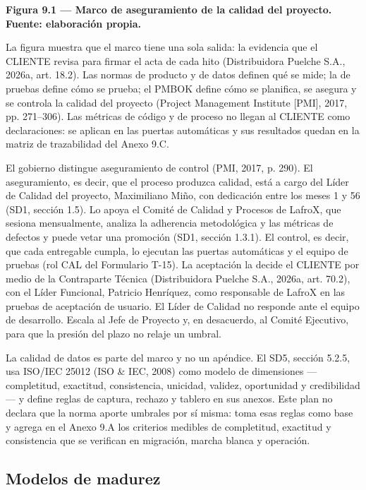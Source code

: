 \textbf{Figura 9.1 — Marco de aseguramiento de la calidad del proyecto. Fuente: elaboración propia.}

La figura muestra que el marco tiene una sola salida: la evidencia que el CLIENTE revisa para firmar el acta de cada hito (Distribuidora Puelche S.A., 2026a, art. 18.2). Las normas de producto y de datos definen qué se mide; la de pruebas define cómo se prueba; el PMBOK define cómo se planifica, se asegura y se controla la calidad del proyecto (Project Management Institute [PMI], 2017, pp. 271–306). Las métricas de código y de proceso no llegan al CLIENTE como declaraciones: se aplican en las puertas automáticas y sus resultados quedan en la matriz de trazabilidad del Anexo 9.C.

El gobierno distingue aseguramiento de control (PMI, 2017, p. 290). El aseguramiento, es decir, que el proceso produzca calidad, está a cargo del Líder de Calidad del proyecto, Maximiliano Miño, con dedicación entre los meses 1 y 56 (SD1, sección 1.5). Lo apoya el Comité de Calidad y Procesos de LafroX, que sesiona mensualmente, analiza la adherencia metodológica y las métricas de defectos y puede vetar una promoción (SD1, sección 1.3.1). El control, es decir, que cada entregable cumpla, lo ejecutan las puertas automáticas y el equipo de pruebas (rol CAL del Formulario T-15). La aceptación la decide el CLIENTE por medio de la Contraparte Técnica (Distribuidora Puelche S.A., 2026a, art. 70.2), con el Líder Funcional, Patricio Henríquez, como responsable de LafroX en las pruebas de aceptación de usuario. El Líder de Calidad no responde ante el equipo de desarrollo. Escala al Jefe de Proyecto y, en desacuerdo, al Comité Ejecutivo, para que la presión del plazo no relaje un umbral.

La calidad de datos es parte del marco y no un apéndice. El SD5, sección 5.2.5, usa ISO/IEC 25012 (ISO \& IEC, 2008) como modelo de dimensiones —completitud, exactitud, consistencia, unicidad, validez, oportunidad y credibilidad— y define reglas de captura, rechazo y tablero en sus anexos. Este plan no declara que la norma aporte umbrales por sí misma: toma esas reglas como base y agrega en el Anexo 9.A los criterios medibles de completitud, exactitud y consistencia que se verifican en migración, marcha blanca y operación.

\subsection{Modelos de madurez}

